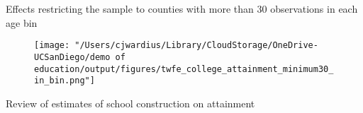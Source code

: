 \documentclass[notes,11pt, aspectratio=169]{beamer}
\begin{document}
\begin{frame}[label=min30]{Effects restricting the sample to counties with more than 30 observations in each age bin}
  \begin{figure}
        \centering
        \texttt{[image: "/Users/cjwardius/Library/CloudStorage/OneDrive-UCSanDiego/demo of education/output/figures/twfe\_college\_attainment\_minimum30\_in\_bin.png"]}
    \end{figure}
    \centering
    \hyperlink{robustness}{}
\end{frame}


\begin{frame}[label=reviewestimates]{Review of estimates of school construction on attainment}
  
  \vspace{1em}
  \centering
  \hyperlink{effects}{}
\end{frame}
\end{document}
